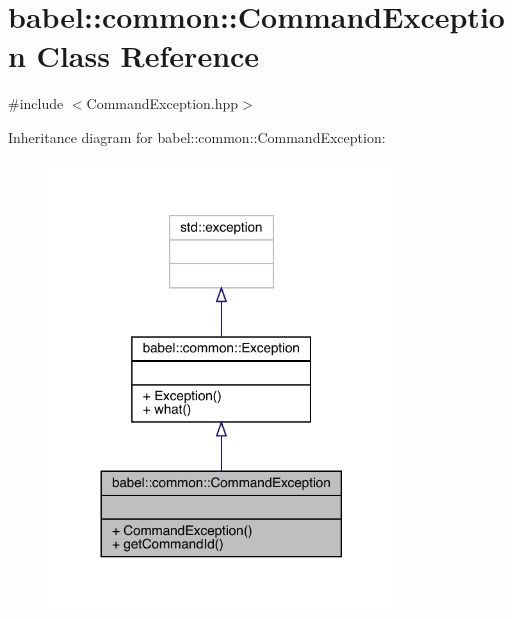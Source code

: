 \hypertarget{classbabel_1_1common_1_1_command_exception}{}\section{babel\+:\+:common\+:\+:Command\+Exception Class Reference}
\label{classbabel_1_1common_1_1_command_exception}


{\ttfamily \#include $<$Command\+Exception.\+hpp$>$}



Inheritance diagram for babel\+:\+:common\+:\+:Command\+Exception\+:\nopagebreak
\begin{figure}[H]
\begin{center}
\leavevmode
\includegraphics[width=260pt]{classbabel_1_1common_1_1_command_exception__inherit__graph}
\end{center}
\end{figure}


